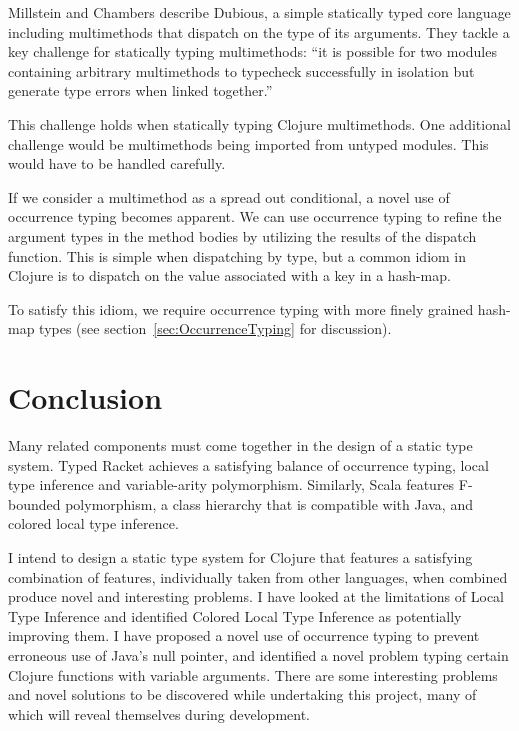 Millstein and Chambers \cite{Millstein02modularstatically}
describe Dubious, a simple statically typed core language including multimethods that
dispatch on the type of its arguments. They tackle a key challenge for statically typing
multimethods: ``it is possible for two modules containing arbitrary multimethods to typecheck
successfully in isolation but generate type errors when linked together.'' \cite{Millstein02modularstatically}

This challenge holds when statically typing Clojure multimethods.
One additional challenge would be multimethods being imported from 
untyped modules. This would have to be handled carefully.

If we consider a multimethod as a spread out conditional, a
novel use of occurrence typing becomes apparent. We can use
occurrence typing to refine the argument types in the method bodies
by utilizing the results of the dispatch function. This is simple
when dispatching by type, but a common idiom in Clojure is to dispatch
on the value associated with a key in a hash-map. 

To satisfy this idiom, we require occurrence typing with more
finely grained hash-map types (see section~\ref{sec:OccurrenceTyping} for discussion).

\section{Conclusion}

Many related components must come together in the design of a
static type system. Typed Racket achieves a satisfying balance of 
occurrence typing, local type inference and variable-arity polymorphism.
Similarly, Scala features F-bounded polymorphism, a class hierarchy
that is compatible with Java, and colored local type inference.

I intend to design a static type system for Clojure
that features a satisfying combination of features, individually taken from other
languages, when combined produce novel and interesting problems.
I have looked at the limitations of Local Type Inference and identified Colored Local
Type Inference as potentially improving them.
I have proposed a novel use of occurrence typing to prevent erroneous use of Java's
null pointer, and identified a novel problem typing certain Clojure functions with variable
arguments.
There are some interesting problems and novel solutions to be discovered while undertaking this
project, many of which will reveal themselves during development.
